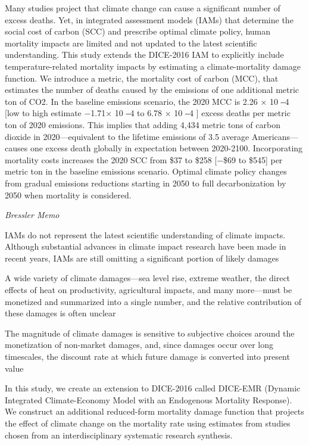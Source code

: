 \documentclass[
]{book}
\begin{document}
Many studies project that climate change can cause a significant number of excess deaths.
Yet, in integrated assessment models (IAMs) that determine the social cost of carbon (SCC)
and prescribe optimal climate policy, human mortality impacts are limited and not updated to
the latest scientific understanding. This study extends the DICE-2016 IAM to explicitly
include temperature-related mortality impacts by estimating a climate-mortality damage
function. We introduce a metric, the mortality cost of carbon (MCC), that estimates the
number of deaths caused by the emissions of one additional metric ton of CO2. In the
baseline emissions scenario, the 2020 MCC is 2.26 × 10 ‒4 {[}low to high estimate −1.71× 10 ‒4
to 6.78 × 10 ‒4 {]} excess deaths per metric ton of 2020 emissions. This implies that adding
4,434 metric tons of carbon dioxide in 2020---equivalent to the lifetime emissions of 3.5
average Americans---causes one excess death globally in expectation between 2020-2100.
Incorporating mortality costs increases the 2020 SCC from \$37 to \$258 {[}−\$69 to \$545{]} per
metric ton in the baseline emissions scenario. Optimal climate policy changes from gradual
emissions reductions starting in 2050 to full decarbonization by 2050 when mortality is
considered.

\emph{Bressler Memo}

IAMs do not represent the latest scientific understanding of climate impacts. Although substantial advances in climate impact research have been made in recent years, IAMs are still omitting a significant portion of likely damages

A wide variety of climate damages---sea level rise, extreme weather, the direct effects of heat on productivity, agricultural impacts, and many more---must be monetized and summarized into a single number, and the relative contribution of these damages is often unclear

The magnitude of climate damages is sensitive to subjective choices around the monetization of non-market damages, and, since damages occur over long timescales, the discount rate at which future damage is converted into present value

In this study, we create an extension to DICE-2016 called DICE-EMR (Dynamic Integrated Climate-Economy Model with an Endogenous Mortality Response). We construct an additional reduced-form mortality damage function that projects the effect of climate change on the mortality rate using estimates from studies chosen from an interdisciplinary systematic research synthesis.
\end{document}
